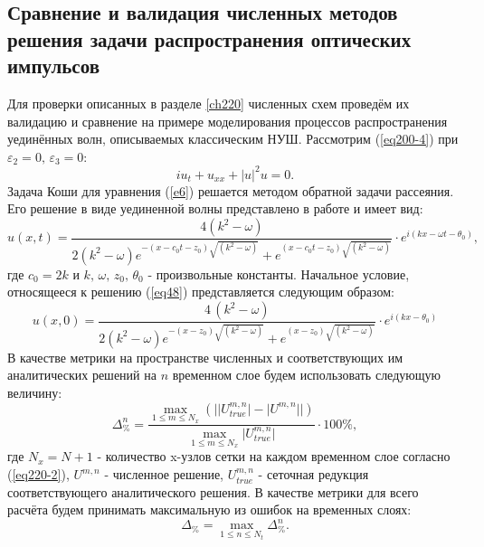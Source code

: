 \documentclass[14pt,a4paper]{extreport}
\begin{document}
		\subsection{Сравнение и валидация численных методов решения задачи распространения оптических импульсов}\label{ch310}
			Для проверки описанных в разделе \ref{ch220} численных схем проведём их валидацию и сравнение на примере моделирования процессов распространения уединённых волн, описываемых классическим НУШ. Рассмотрим (\ref{eq200-4}) при \(\varepsilon_{2}=0,\,\varepsilon_{3}=0\):
			\begin{equation}\label{e6}
				iu_{t}+u_{xx}+|u|^2 u=0.
			\end{equation}
			Задача Коши для уравнения (\ref{e6}) решается методом обратной задачи рассеяния. Его решение в виде уединенной волны представлено в работе \cite{Rad3} и имеет вид:
			\begin{equation} \label{eq48}
				u(x,t)=\frac{4(k^{2}-\omega)}{2 (k^{2}-\omega) e^{-\left(x-c_{0}t-z_{0}\right)\sqrt{(k^{2}-\omega)}}+e^{\left(x-c_{0}t-z_{0}\right)\sqrt{(k^{2}-\omega)}}}\cdot e^{i(kx-\omega t-\theta_{0})},
			\end{equation}
			где \(c_{0}=2k\) и \( k,\, \omega,\, z_{0},\, \theta_{0}\) - произвольные константы.
			Начальное условие, относящееся к решению (\ref{eq48}) представляется следующим образом:
			\begin{equation}\label{eq55}
				u(x,0)=\frac{4\,(k^{2}-\omega)}{2 (k^{2}-\omega) e^{-(x-z_{0})\sqrt{(k^{2}-\omega)}}+e^{(x-z_{0})\sqrt{(k^{2}-\omega)}}}\cdot e^{i(kx-\theta_{0})}
			\end{equation}
			В качестве метрики на пространстве численных и соответствующих им аналитических решений на \(n\) временном слое будем использовать следующую величину:
			\begin{equation}\label{eq300-1}
				\Delta_{\%}^{n}=\frac{\displaystyle\mathop{\max}_{1 \leq m \leq N_{x}}\left(\Big|\big|U^{m,n}_{true}\big|-\big|U^{m,n}\big|\Big|\right)}{\displaystyle\mathop{\max}_{1 \leq m \leq N_{x}}\big|U^{m,n}_{true}\big|} \cdot 100\%,
			\end{equation}
			где \(N_{x}=N+1\) - количество x-узлов сетки на каждом временном слое согласно (\ref{eq220-2}), \(U^{m,n}\) - численное решение, \(U^{m,n}_{true}\) - сеточная редукция соответствующего аналитического решения. В качестве метрики для всего расчёта будем принимать максимальную из ошибок на временных слоях:
			\begin{equation}\label{eq300-1}
				\Delta_{\%}=\max_{1 \leq n \leq N_{t}}\Delta_{\%}^{n}.
			\end{equation}
\end{document}
